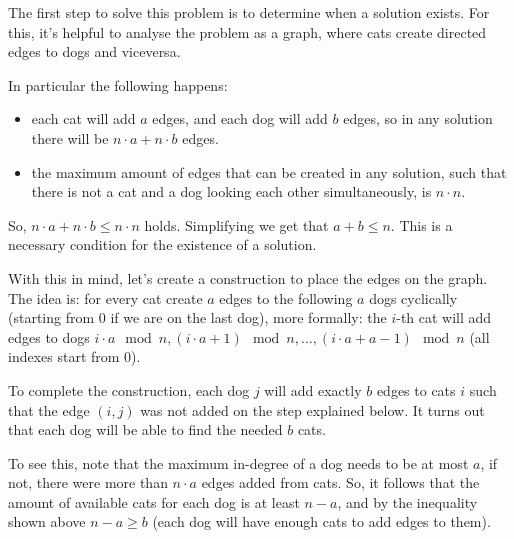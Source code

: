 The first step to solve this problem is to determine when a solution exists.
For this, it's helpful to analyse the problem as a graph, where cats create
directed edges to dogs and viceversa.

In particular the following happens:

\begin{itemize}

    \item each cat will add $a$ edges, and each dog will add $b$ edges, so in
        any solution there will be $n \cdot a + n \cdot b$ edges.

    \item the maximum amount of edges that can be created in any solution, such
        that there is not a cat and a dog looking each other simultaneously, is
        $n \cdot n$.

\end{itemize}

So, $n \cdot a + n \cdot b \le n \cdot n$ holds. Simplifying we get that $a + b
\le n$. This is a necessary condition for the existence of a solution.

With this in mind, let's create a construction to place the edges on the graph.
The idea is: for every cat create $a$ edges to the following $a$ dogs
cyclically (starting from 0 if we are on the last dog), more formally: the
$i$-th cat will add edges to dogs $i \cdot a \mod n, (i \cdot a + 1) \mod n,
\ldots, (i \cdot a + a - 1) \mod n$ (all indexes start from 0).

To complete the construction, each dog $j$ will add exactly $b$ edges to cats
$i$ such that the edge $(i, j)$ was not added on the step explained below. It
turns out that each dog will be able to find the needed $b$ cats.

To see this, note that the maximum in-degree of a dog needs to be at most $a$,
if not, there were more than $n \cdot a$ edges added from cats. So, it follows
that the amount of available cats for each dog is at least $n - a$, and by the
inequality shown above $n - a \ge b$ (each dog will have enough cats to add
edges to them).

